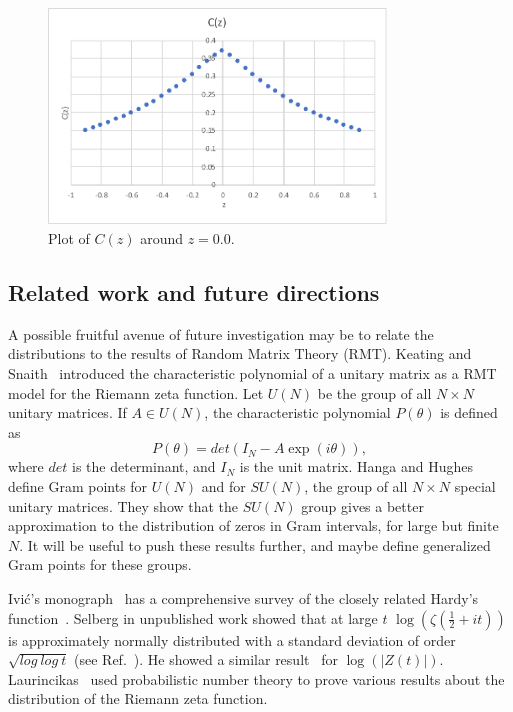 \documentclass[twoside]{article}
\begin{document}
\begin{figure}
\centering
\includegraphics[width=0.8\textwidth]{Cz.pdf}
\caption[]{ 
 Plot of $C(z)$ around $z=0.0$. 
  }
\vspace{1mm}
\label{Cz}
\end{figure}


\subsection{\label{related}Related work and future directions}
A possible fruitful avenue of future investigation may be to relate the distributions to 
the results of Random Matrix Theory (RMT).  Keating and  Snaith~\cite{Keating 2000a} introduced the 
characteristic polynomial of a unitary matrix as a RMT model for the Riemann zeta function. 
Let $U(N)$ be the group of  all $N \times N$ unitary matrices.
If $A \in U(N)$, the characteristic polynomial $P(\theta)$ is defined as
\begin{equation}
P(\theta) = det(I_N-A\exp {(i\theta)}),
\label{eq:uNeigen}
\end{equation}
where $det$ is the determinant, and $I_N$ is the unit matrix.
Hanga and Hughes~\cite{Hanga 2020} define Gram points for  $U(N)$ and 
for $SU(N)$, the group of 
all $N \times N$ special unitary matrices. They show that the $SU(N)$ group gives
a better approximation to the distribution of zeros in Gram intervals, for large but
finite $N$. It will be useful to push these results further, and maybe define 
generalized Gram points for these groups.

Ivi\'c's monograph~\cite{Ivic 2013} 
has a comprehensive survey of  the  closely related Hardy's function~\cite{Hardy 1918}.
Selberg in unpublished work showed that at large $t$ $\log (\zeta(\frac{1}{2} + it))$ is 
approximately normally distributed with a standard deviation of 
order $\sqrt{log~log~t}$ (see Ref.~\cite{Hejhal}). He showed a 
similar result~\cite{Selberg 1989, Selberg 1991} for $\log (|Z(t)|)$. 
Laurincikas~\cite{Laurincikas}  used probabilistic number theory to prove various results 
about the distribution of the Riemann zeta function.
\end{document}
